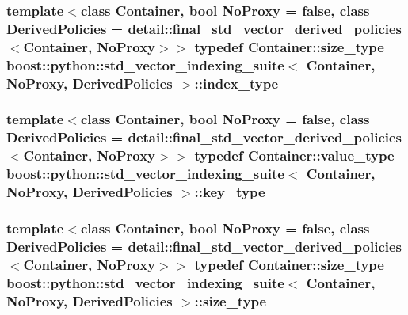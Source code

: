 \hypertarget{classboost_1_1python_1_1std__vector__indexing__suite_a3124827b535a08798fbd33b9fee7b668}{
\subsubsection[{index\-\_\-type}]{\setlength{\rightskip}{0pt plus 5cm}template$<$class \-Container, bool \-No\-Proxy = false, class \-Derived\-Policies = detail\-::final\-\_\-std\-\_\-vector\-\_\-derived\-\_\-policies$<$\-Container, No\-Proxy$>$$>$ typedef \-Container\-::size\-\_\-type {\bf boost\-::python\-::std\-\_\-vector\-\_\-indexing\-\_\-suite}$<$ \-Container, \-No\-Proxy, \-Derived\-Policies $>$\-::{\bf index\-\_\-type}}}\label{classboost_1_1python_1_1std__vector__indexing__suite_a3124827b535a08798fbd33b9fee7b668}
\hypertarget{classboost_1_1python_1_1std__vector__indexing__suite_aad8e15443d4d920d6b15e1781fba568a}{
\subsubsection[{key\-\_\-type}]{\setlength{\rightskip}{0pt plus 5cm}template$<$class \-Container, bool \-No\-Proxy = false, class \-Derived\-Policies = detail\-::final\-\_\-std\-\_\-vector\-\_\-derived\-\_\-policies$<$\-Container, No\-Proxy$>$$>$ typedef \-Container\-::value\-\_\-type {\bf boost\-::python\-::std\-\_\-vector\-\_\-indexing\-\_\-suite}$<$ \-Container, \-No\-Proxy, \-Derived\-Policies $>$\-::{\bf key\-\_\-type}}}\label{classboost_1_1python_1_1std__vector__indexing__suite_aad8e15443d4d920d6b15e1781fba568a}
\hypertarget{classboost_1_1python_1_1std__vector__indexing__suite_af582d879611acb090b6d227a64914cc6}{
\subsubsection[{size\-\_\-type}]{\setlength{\rightskip}{0pt plus 5cm}template$<$class \-Container, bool \-No\-Proxy = false, class \-Derived\-Policies = detail\-::final\-\_\-std\-\_\-vector\-\_\-derived\-\_\-policies$<$\-Container, No\-Proxy$>$$>$ typedef \-Container\-::size\-\_\-type {\bf boost\-::python\-::std\-\_\-vector\-\_\-indexing\-\_\-suite}$<$ \-Container, \-No\-Proxy, \-Derived\-Policies $>$\-::{\bf size\-\_\-type}}}\label{classboost_1_1python_1_1std__vector__indexing__suite_af582d879611acb090b6d227a64914cc6}


